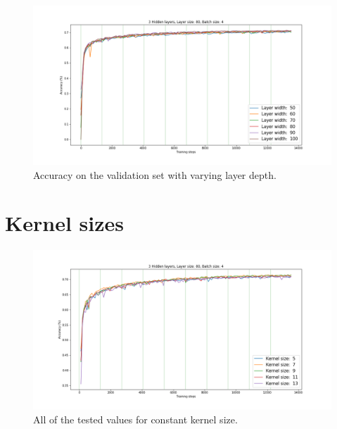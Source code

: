 \begin{figure}[H]
  \centering
  \includegraphics[width=\linewidth]{../graphs/new/layer_width_2}
  \caption{Accuracy on the validation set with varying layer depth.}
\end{figure}

\section*{Kernel sizes}

\begin{figure}[H]
  \centering
  \includegraphics[width=\linewidth]{../graphs/new/kernel_size_1}
  \caption{All of the tested values for constant kernel size.}
\end{figure}